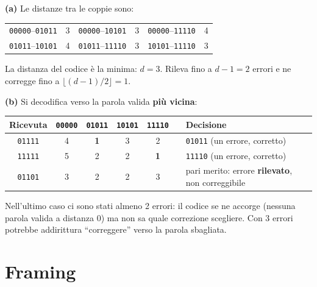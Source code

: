 \svolgimento
\textbf{(a)} Le distanze tra le coppie sono:
\begin{center}
\begin{tabular}{lc@{\qquad}lc@{\qquad}lc}
\toprule
\texttt{00000}--\texttt{01011} & 3 & \texttt{00000}--\texttt{10101} & 3 & \texttt{00000}--\texttt{11110} & 4 \\
\texttt{01011}--\texttt{10101} & 4 & \texttt{01011}--\texttt{11110} & 3 & \texttt{10101}--\texttt{11110} & 3 \\
\bottomrule
\end{tabular}
\end{center}
La distanza del codice è la minima: $d = 3$. Rileva fino a $d - 1 = 2$ errori e ne corregge fino a $\lfloor (d-1)/2 \rfloor = 1$.

\textbf{(b)} Si decodifica verso la parola valida \textbf{più vicina}:
\begin{center}
\small
\begin{tabular}{ccccccl}
\toprule
\textbf{Ricevuta} & \texttt{00000} & \texttt{01011} & \texttt{10101} & \texttt{11110} & & \textbf{Decisione} \\
\midrule
\texttt{01111} & 4 & \textbf{1} & 3 & 2 & & \texttt{01011} (un errore, corretto) \\
\texttt{11111} & 5 & 2 & 2 & \textbf{1} & & \texttt{11110} (un errore, corretto) \\
\texttt{01101} & 3 & 2 & 2 & 3 & & pari merito: errore \textbf{rilevato}, non correggibile \\
\bottomrule
\end{tabular}
\end{center}
Nell'ultimo caso ci sono stati almeno 2 errori: il codice se ne accorge (nessuna parola valida a distanza 0) ma non sa quale correzione
scegliere. Con 3 errori potrebbe addirittura ``correggere'' verso la parola sbagliata.


\section{Framing}

